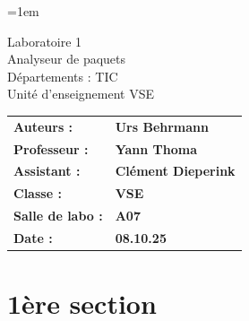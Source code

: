 \documentclass[a4paper,12pt]{article}
\author{Urs Behrmann}
\begin{document}
\emergencystretch=1em %

\thispagestyle{firstpage}


\vspace*{2cm}
\begin{center}
    \Huge Laboratoire 1 \\
    \vspace{0.2cm}
    \Large Analyseur de paquets\\
    \vspace{1cm}
    \small Départements : TIC\\
    Unité d'enseignement VSE\\
\end{center}

\vspace{9cm}

\renewcommand{\arraystretch}{1.5} %

\begin{flushleft} %
    \begin{tabular}{@{}l l@{}}
        \textbf{Auteurs :}       & \textbf{Urs Behrmann} \\
        \textbf{Professeur :}    & \textbf{Yann Thoma} \\
        \textbf{Assistant :}     & \textbf{Clément Dieperink} \\
        \textbf{Classe :}        & \textbf{VSE} \\
        \textbf{Salle de labo :} & \textbf{A07} \\
        \textbf{Date :}          & \textbf{08.10.25} \\
    \end{tabular}
\end{flushleft}

\newpage

\pagestyle{otherpages}

\tableofcontents

\newpage

\section{1ère section}
\end{document}
